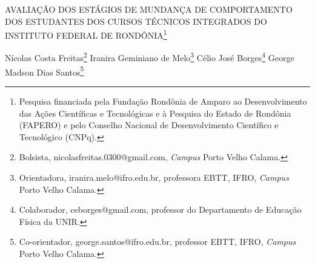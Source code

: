 \documentclass[article,12pt,onesidea,4paper,english,brazil]{abntex2}
\begin{document}
	
	
	\frenchspacing 
	
	\begin{center}
		\LARGE AVALIAÇÃO DOS ESTÁGIOS DE MUNDANÇA DE COMPORTAMENTO DOS
		ESTUDANTES DOS CURSOS TÉCNICOS INTEGRADOS DO \\INSTITUTO
		FEDERAL DE RONDÔNIA\footnote{Pesquisa financiada pela Fundação Rondônia de Amparo ao Desenvolvimento das Ações Científicas e Tecnológicas e à Pesquisa do Estado de Rondônia (FAPERO) e pelo Conselho Nacional de Desenvolvimento Científico e Tecnológico (CNPq).}
		
		\normalsize
		Nícolas Costa Freitas\footnote{Bolsista, nicolasfreitas.0300@gmail.com, \textit{Campus} Porto Velho Calama.} 
		Iranira Geminiano de Melo\footnote{Orientadora, iranira.melo@ifro.edu.br, professora EBTT, IFRO, \textit{Campus} Porto Velho Calama.} 
		Célio José Borges\footnote{Colaborador, ceborges@gmail.com, professor do Departamento de Educação Física da UNIR.} 
		George Madson Dias Santos\footnote{Co-orientador, george.santos@ifro.edu.br, professor EBTT, IFRO, \textit{Campus} Porto Velho Calama.} 
	\end{center}
	
\end{document}
